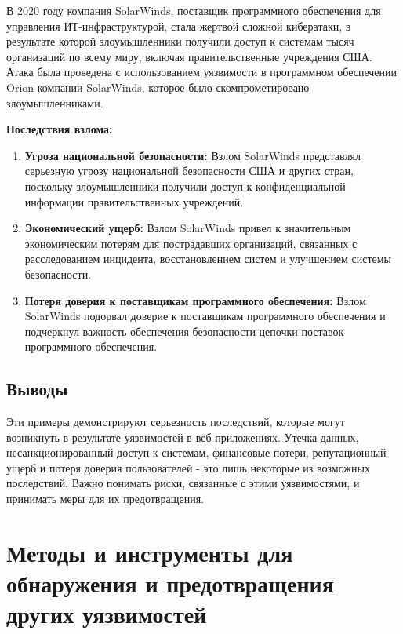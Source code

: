 \documentclass[a4paper,12pt]{diplom}
\begin{document}
	 В 2020 году компания SolarWinds, поставщик программного обеспечения для управления ИТ-инфраструктурой, стала жертвой сложной кибератаки, в результате которой злоумышленники получили доступ к системам тысяч организаций по всему миру, включая правительственные учреждения США.  Атака была проведена с использованием уязвимости в программном обеспечении Orion компании SolarWinds, которое было скомпрометировано злоумышленниками.\cite{SolarWinds_attack}
	 
	 \textbf{Последствия взлома:}
	 
	 \begin{enumerate}[label=\arabic{enumi})]
	 	\item \textbf{Угроза национальной безопасности:}  Взлом SolarWinds представлял серьезную угрозу национальной безопасности США и других стран, поскольку злоумышленники получили доступ к конфиденциальной информации правительственных учреждений.
	 	\item \textbf{Экономический ущерб:}  Взлом SolarWinds привел к значительным экономическим потерям для пострадавших организаций, связанных с расследованием инцидента, восстановлением систем и улучшением системы безопасности. 
	 	\item \textbf{Потеря доверия к поставщикам программного обеспечения:}  Взлом SolarWinds подорвал доверие к поставщикам программного обеспечения и подчеркнул важность обеспечения безопасности цепочки поставок программного обеспечения. 
	 \end{enumerate}
	 
	 \subsection{Выводы}
	 
	 Эти примеры демонстрируют серьезность последствий, которые могут возникнуть в результате уязвимостей в веб-приложениях. Утечка данных, несанкционированный доступ к системам, финансовые потери, репутационный ущерб и потеря доверия пользователей - это лишь некоторые из возможных последствий.  Важно понимать риски, связанные с этими уязвимостями, и принимать меры для их предотвращения. 
	 
	 
	 
	 
	 
	 
	 
	 
	 
	 
	 
	 
	 
	 
	 \section{Методы и инструменты для обнаружения и предотвращения других уязвимостей}
	 
\end{document}
